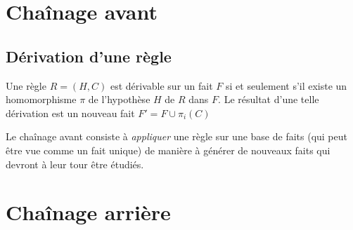
\section{Chaînage avant}\label{def_forward}

\subsection{Dérivation d'une règle}\label{def_derivation}
Une règle $R = (H,C)$ est dérivable sur un fait $F$ si et seulement s'il existe un
homomorphisme $\pi$ de l'hypothèse $H$ de $R$ dans $F$.
Le résultat d'une telle dérivation est un nouveau fait $F' = F \cup \pi_i(C)$

Le chaînage avant consiste à {\em appliquer} une règle sur une base de faits (qui peut
être vue comme un fait unique) de manière à générer de nouveaux faits qui devront à leur
tour être étudiés.


\section{Chaînage arrière}\label{def_backward}

